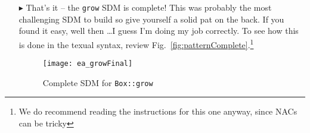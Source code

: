 \begin{itemize}
\vspace{0.5cm}

\item[$\blacktriangleright$]  That's it -- the \texttt{grow} SDM is complete! This was probably the most challenging SDM to build so give yourself a solid 
pat on the back. If you found it easy, well then \ldots I guess I'm doing my job correctly. To see how this is done in the texual syntax, review
Fig.~\ref{fig:patternComplete}.\footnote{We do recommend reading the instructions for this one anyway, since NACs can be tricky}

\vspace{0.5cm}

\begin{figure}[htbp]
\begin{center}
  \texttt{[image: ea\_growFinal]}
  \caption{Complete SDM for \texttt{Box::grow}}  
  \label{fig:growComplete}
\end{center}
\end{figure}
\FloatBarrier


\end{itemize}
